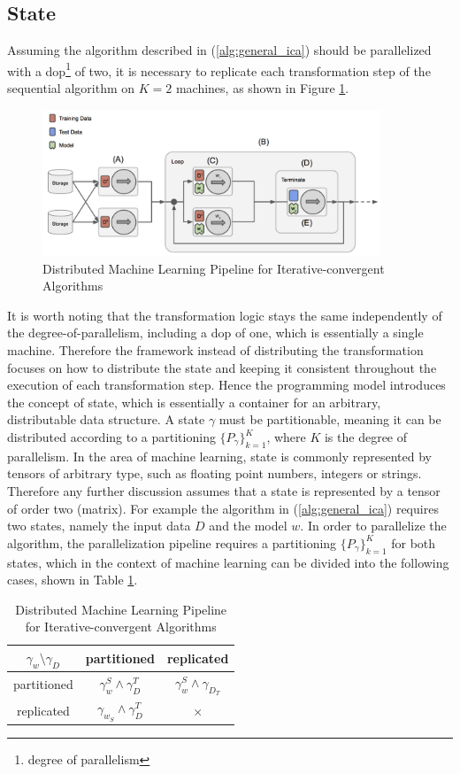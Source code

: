 \subsection{State}
Assuming the algorithm described in (\ref{alg:general_ica}) should be parallelized with a dop\footnote{degree of parallelism} of two, it is necessary to replicate each transformation step of the sequential algorithm on $K = 2$ machines, as shown in Figure \ref{fig:ica_control_flow_dist}.
\begin{figure}[ht]
\centering
\includegraphics[width=0.9\textwidth]{img/ica_control_flow_dist.png}
\caption{Distributed Machine Learning Pipeline for Iterative-convergent Algorithms}
\label{fig:ica_control_flow_dist}
\end{figure}
It is worth noting that the transformation logic stays the same independently of the degree-of-parallelism, including a dop of one, which is essentially a single machine.
Therefore the framework instead of distributing the transformation focuses on how to distribute the state and keeping it consistent throughout the execution of each transformation step.
Hence the programming model introduces the concept of state, which is essentially a container for an arbitrary, distributable data structure.
A state $\gamma$ must be partitionable, meaning it can be distributed according to a partitioning $\{P_{\gamma}\}_{k=1}^K$, where $K$ is the degree of parallelism.
In the area of machine learning, state is commonly represented by tensors of arbitrary type, such as floating point numbers, integers or strings.
Therefore any further discussion assumes that a state is represented by a tensor of order two (matrix).
For example the algorithm in (\ref{alg:general_ica}) requires two states, namely the input data $D$ and the model $w$.
In order to parallelize the algorithm, the parallelization pipeline requires a partitioning $\{P_\gamma\}_{k=1}^K$ for both states, which in the context of machine learning can be divided into the following cases, shown in Table \ref{tab:ica_partitioning}.
\begin{table}[h]
\begin{center}
\begin{tabular}{ | c | c | c |}
\hline
$\gamma_w \setminus \gamma_D$ & partitioned & replicated \\ \hline
partitioned & $\gamma_w^S \wedge \gamma_D^T$ &  $\gamma_w^S \wedge \gamma_{D_T}$\\ \hline
replicated & $\gamma_{w_S} \wedge \gamma_D^T$ & $\times$\\
\hline
\end{tabular}
\label{tab:ica_partitioning}
\caption{Distributed Machine Learning Pipeline for Iterative-convergent Algorithms}
\end{center}
\end{table}
